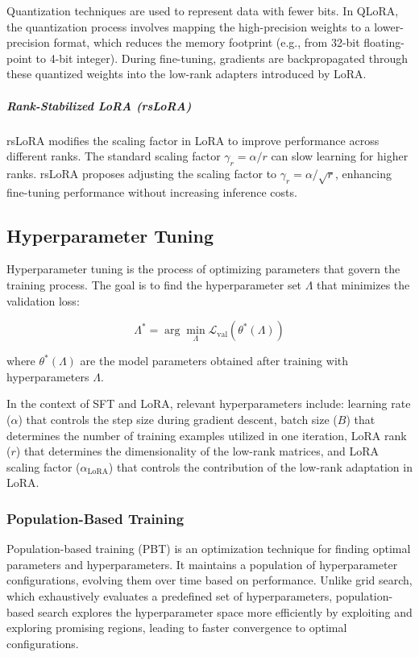 \documentclass[11pt, onecolumn]{article}
\newcounter{para}
\begin{document}
Quantization techniques are used to represent data with fewer bits. In QLoRA, the quantization process involves mapping the high-precision weights to a lower-precision format, which reduces the memory footprint (e.g., from 32-bit floating-point to 4-bit integer). During fine-tuning, gradients are backpropagated through these quantized weights into the low-rank adapters introduced by LoRA.

\subparagraph{Rank-Stabilized LoRA (rsLoRA)} \label{sec:pre-rslora}

rsLoRA modifies the scaling factor in LoRA to improve performance across different ranks. The standard scaling factor \( \gamma_r = \alpha / r \) can slow learning for higher ranks. rsLoRA proposes adjusting the scaling factor to \( \gamma_r = \alpha / \sqrt{r} \), enhancing fine-tuning performance without increasing inference costs.

\subsection{Hyperparameter Tuning} \label{sec:pre-hyperparam-tuning}

Hyperparameter tuning is the process of optimizing parameters that govern the training process. The goal is to find the hyperparameter set \( \Lambda \) that minimizes the validation loss:

\[
\Lambda^* = \arg\min_{\Lambda} \mathcal{L}_{\text{val}}(\theta^*(\Lambda))
\]

where \( \theta^*(\Lambda) \) are the model parameters obtained after training with hyperparameters \( \Lambda \).

In the context of SFT and LoRA, relevant hyperparameters include: learning rate (\( \alpha \)) that controls the step size during gradient descent, batch size (\( B \)) that determines the number of training examples utilized in one iteration, LoRA rank (\( r \)) that determines the dimensionality of the low-rank matrices, and LoRA scaling factor (\( \alpha_{\text{LoRA}} \)) that controls the contribution of the low-rank adaptation in LoRA.

\subsubsection{Population-Based Training} \label{sec:pbt}

Population-based training (PBT) is an optimization technique for finding optimal parameters and hyperparameters. It maintains a population of hyperparameter configurations, evolving them over time based on performance. Unlike grid search, which exhaustively evaluates a predefined set of hyperparameters, population-based search explores the hyperparameter space more efficiently by exploiting and exploring promising regions, leading to faster convergence to optimal configurations.
\end{document}
